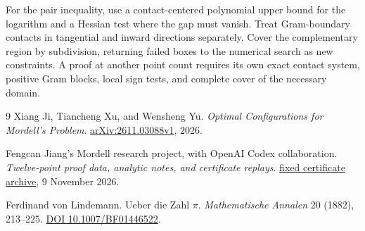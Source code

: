 \documentclass[11pt,letterpaper]{article}
\theoremstyle{remark}
\newcommand{\certroot}{\href{https://github.com/harrykane8816627373-cell/mordell-research/tree/3c922f3446f4f32441d75aef1d7907d38b0544f7}{fixed certificate archive}}
\begin{document}
For the pair inequality, use a contact-centered polynomial upper bound
for the logarithm and a Hessian test where the gap must vanish. Treat
Gram-boundary contacts in tangential and inward directions separately.
Cover the complementary region by subdivision, returning failed boxes
to the numerical search as new constraints. A proof at another point
count requires its own exact contact system, positive Gram blocks,
local sign tests, and complete cover of the necessary domain.

\begin{thebibliography}{9}
Xiang Ji, Tiancheng Xu, and Wensheng Yu.
\newblock \emph{Optimal Configurations for Mordell's Problem}.
\newblock \href{https://arxiv.org/abs/2611.03088v1}{arXiv:2611.03088v1}, 2026.

Fengcan Jiang's Mordell research project, with OpenAI Codex collaboration.
\newblock \emph{Twelve-point proof data, analytic notes, and certificate replays}.
\newblock \certroot, 9 November 2026.

Ferdinand von Lindemann.
\newblock Ueber die Zahl \(\pi\).
\newblock \emph{Mathematische Annalen} 20 (1882), 213--225.
\newblock \href{https://doi.org/10.1007/BF01446522}{DOI 10.1007/BF01446522}.
\end{thebibliography}
\end{document}
